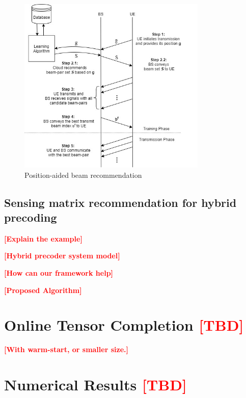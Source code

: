 \documentclass[12pt, draftcls, onecolumn]{IEEEtran}
\theoremstyle{plain}
\theoremstyle{definition}
\theoremstyle{remark}
\newcommand{\nt}[1]{\textcolor{red}{\textbf{[#1]}}}
\begin{document}
\begin{figure}
	\centering
	\includegraphics[width=9cm]{Journal_UL_MIMO_BF_recommendation.jpg}
	\caption{Position-aided beam recommendation}
	\label{fig:Beam_recomm_flow}
\end{figure}

\subsection{Sensing matrix recommendation for hybrid precoding}
\nt{Explain the example}

\nt{Hybrid precoder system model}

\nt{How can our framework help}

\nt{Proposed Algorithm}

\section{Online Tensor Completion \nt{TBD}} 
\nt{With warm-start, or smaller size.}
\section{Numerical Results \nt{TBD}}
\end{document}
